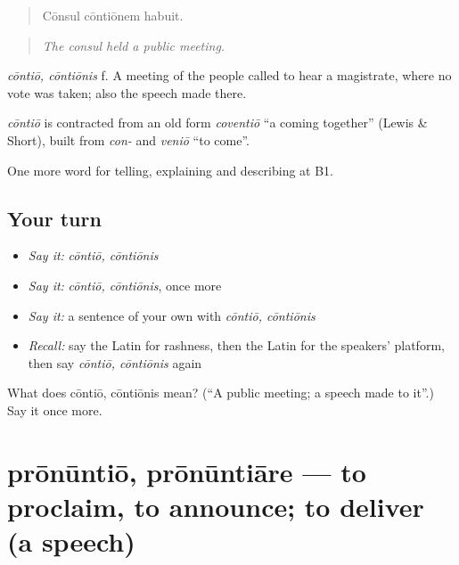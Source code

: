 \begin{quote}
Cōnsul cōntiōnem habuit.
\end{quote}

\begin{quote}
\emph{The consul held a public meeting.}
\end{quote}

\emph{cōntiō, cōntiōnis} f. A meeting of the people called to hear a magistrate, where no vote was taken; also the speech made there.

\begin{cousinweb}
\emph{cōntiō} is contracted from an old form \emph{coventiō} \textquotedblleft{}a coming together\textquotedblright{} (Lewis \& Short), built from \emph{con-} and \emph{veniō} \textquotedblleft{}to come\textquotedblright{}.
\end{cousinweb}

\begin{grammarlens}[title={What you've built}]
One more word for telling, explaining and describing at B1.
\end{grammarlens}

\subsection*{Your turn}
\begin{itemize}
\raggedright
  \item \emph{Say it:} \emph{cōntiō, cōntiōnis}
  \item \emph{Say it:} \emph{cōntiō, cōntiōnis}, once more
  \item \emph{Say it:} a sentence of your own with \emph{cōntiō, cōntiōnis}
  \item \emph{Recall:} say the Latin for rashness, then the Latin for the speakers' platform, then say \emph{cōntiō, cōntiōnis} again
\end{itemize}

\begin{tcolorbox}[breakable,colback=teal!4,colframe=teal!35!black,title={Before you move on}]
What does cōntiō, cōntiōnis mean? (\textquotedblleft{}A public meeting; a speech made to it\textquotedblright{}.) Say it once more.
\end{tcolorbox}
\section[prōnūntiō, prōnūntiāre]{prōnūntiō, prōnūntiāre — to proclaim, to announce; to deliver (a speech)}

